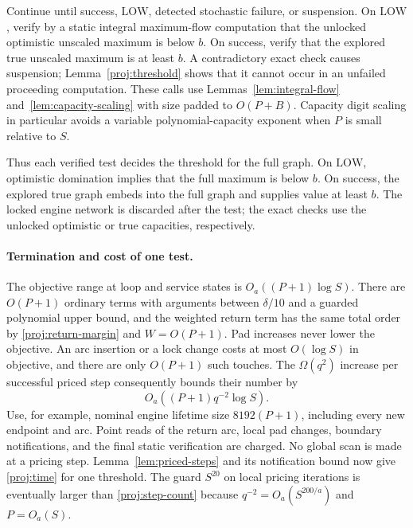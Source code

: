 Continue until success, \(\mathrm{LOW}\), detected stochastic
failure, or suspension.  On \(\mathrm{LOW}\), verify by a static
integral maximum-flow computation that the unlocked optimistic
unscaled maximum is below \(b\).  On success, verify that the
explored true unscaled maximum is at least \(b\).
A contradictory exact check causes suspension; Lemma~\ref{proj:threshold}
shows that it cannot occur in an unfailed proceeding
computation.  These calls use
Lemmas~\ref{lem:integral-flow} and~\ref{lem:capacity-scaling}
with size padded to \(O(P+B)\).  Capacity digit scaling in
particular avoids a variable polynomial-capacity exponent when
\(P\) is small relative to \(S\).

Thus each verified test decides the threshold for the full graph.
On \(\mathrm{LOW}\), optimistic domination implies that the full
maximum is below \(b\).  On success, the explored true graph embeds
into the full graph and supplies value at least \(b\).
The locked engine network is discarded after the test; the exact
checks use the unlocked optimistic or true capacities, respectively.

\paragraph{Termination and cost of one test.}
The objective range at loop and service states is
\(O_a((P+1)\log S)\).  There are \(O(P+1)\) ordinary terms with
arguments between \(\delta/10\) and a guarded polynomial upper
bound, and the weighted return term has the same total order by
\eqref{proj:return-margin} and \(W=O(P+1)\).
Pad increases never lower the objective.  An arc insertion or a
lock change costs at most \(O(\log S)\) in objective, and there
are only \(O(P+1)\) such touches.  The
\(\Omega(q^2)\) increase per successful priced step consequently
bounds their number by
\begin{equation}
\label{proj:step-count}
                    O_a((P+1)q^{-2}\log S).
\end{equation}
Use, for example, nominal engine lifetime size \(8192(P+1)\),
including every new endpoint and arc.  Point reads of the return
arc, local pad changes, boundary notifications, and the final
static verification are charged.  No global scan is made at a
pricing step.  Lemma~\ref{lem:priced-steps} and its notification
bound now give \eqref{proj:time} for one threshold.  The guard
\(S^{20}\) on local pricing iterations is eventually larger than
\eqref{proj:step-count} because
\(q^{-2}=O_a(S^{200/a})\) and \(P=O_a(S)\).


